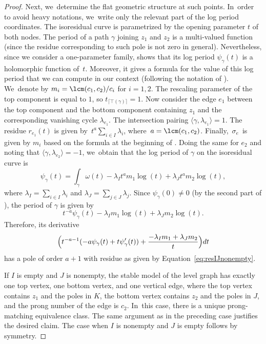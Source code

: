 \begin{proof}
Next, we~determine the flat geometric structure at such points. In~order to avoid heavy notations, we~write only the relevant part of the log period coordinates. The isoresidual curve is parametrized by the opening parameter $t$ of both nodes. The period of a path $\gamma$ joining $z_{1}$ and $z_{2}$ is a multi-valued function (since the residue corresponding to such pole is not zero in general). Nevertheless, since we consider a one-parameter family, \cite[Cor.\,6.3]{BenBound} shows that its log period $\psi_{\gamma}(t)$ is a holomorphic function of~$t$. Moreover, it gives a formula for the value of this log period that we can compute in our context (following the notation of \cite[Def.\,5.1]{BenBound}). We~denote by $m_{i}=\lcm (c_1, c_2)/c_{i}$ for $i=1,2$. The rescaling parameter of the top component is equal to $1$, so $t_{\lceil\top(\gamma)\rceil}=1$. Now consider the edge $e_{1}$ between the top component and the bottom component containing $z_{1}$ and the corresponding vanishing cycle $\lambda_{e_{1}}$. The intersection pairing $\langle\gamma,\lambda_{e_{1}}\rangle = 1$. The residue $r_{e_{1}}(t)$ is given by~$t^{a}\sum_{i\in I}\lambda_{i}$, where~$a = \lcm (c_1, c_2)$. Finally,~$\sigma_{e}$~is given by $m_{i}$ based on the formula at the beginning of \cite[\S 7.4]{BenBound}. Doing the same for $e_{2}$ and noting that $\langle\gamma,\lambda_{e_{2}}\rangle = -1$, we~obtain that the log period of $\gamma$ on the isoresidual curve is
\begin{equation*}
\psi_{\gamma}(t) = \int_{\gamma}\omega(t) - \lambda_{I}t^{a}m_{1}\log(t)+\lambda_{J}t^{a}m_{2}\log(t),
\end{equation*}
where $\lambda_I = \sum_{i\in I}\lambda_{i}$ and $\lambda_J = \sum_{j\in J}\lambda_{j}$.
Since $\psi_{\gamma}(0)\neq0$ (by the second part of \cite[Cor.\,6.3]{BenBound}), the period of $\gamma$ is given by
\[
t^{-a}\psi_{\gamma}(t) - \lambda_{I}m_{1}\log(t)+\lambda_{J}m_{2}\log(t).
\]
Therefore, its derivative
\[
\Bigl(t^{-a-1}(-a\psi_{\gamma}(t)+t\psi_{\gamma}'(t)) + \frac{-\lambda_{I}m_{1} + \lambda_{J}m_{2}}{t}\Bigr)dt
\]
has a pole of order $a+1$ with residue as given by Equation~\eqref{eq:resIJnonempty}.

If $I$ is empty and $J$ is nonempty, the stable model of the level graph has exactly one top vertex, one bottom vertex, and one vertical edge, where the top vertex contains $z_1$ and the poles in $K$, the bottom vertex contains $z_2$ and the poles in $J$, and the prong number of the edge is $c_2$. In~this case, there is a unique prong-matching equivalence class. The same argument as in the preceding case justifies the desired claim. The case when $I$ is nonempty and $J$ is empty follows by symmetry.


\end{proof}
